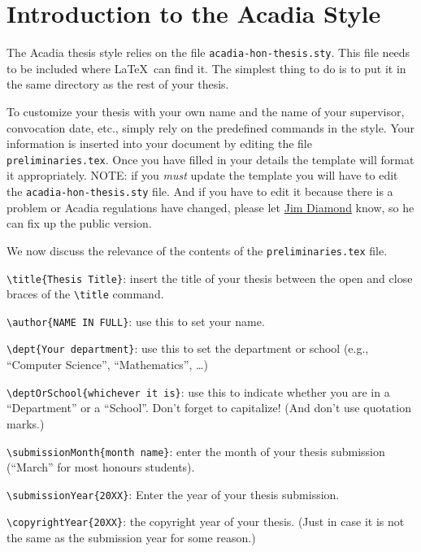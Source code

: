 

\chapter{Introduction to the Acadia Style}
\label{chap:INTRO}

The Acadia thesis style relies on the file \verb|acadia-hon-thesis.sty|.
This file needs to be included where \LaTeX\ can find it.  The
simplest thing to do is to put it in the same directory as the rest of
your thesis.

To customize your thesis with your own name and the name of your
supervisor, convocation date, etc., simply rely on the predefined
commands in the style.  Your information is inserted into your
document by editing the file \verb|preliminaries.tex|.  Once you have
filled in your details the template will format it appropriately.
NOTE: if you \emph{must} update the template you will have to edit the
\verb|acadia-hon-thesis.sty| file.  And if you have to edit it because
there is a problem or Acadia regulations have changed, please let
\href{mailto:jim.diamond@acadiau.ca}{Jim Diamond} know, so he can fix
up the public version.

We now discuss the relevance of the contents of the 
\verb|preliminaries.tex| file.

\smallskip
\noindent\verb|\title{Thesis Title}|: insert the title of your thesis
between the open and close braces of the \verb|\title| command.

\smallskip
\noindent\verb|\author{NAME IN FULL}|: use this to set your name.

\smallskip
\noindent\verb|\dept{Your department}|: use this to set the department
or school (e.g., ``Computer Science'', ``Mathematics'', \dots)

\smallskip
\noindent\verb|\deptOrSchool{whichever it is}|: use this to indicate
whether you are in a ``Department'' or a ``School''.  Don't forget to
capitalize!  (And don't use quotation marks.)

\smallskip
\noindent\verb|\submissionMonth{month name}|: enter the month of your
thesis submission (``March'' for most honours students).

\smallskip
\noindent\verb|\submissionYear{20XX}|: Enter the year of your
thesis submission.

\smallskip
\noindent\verb|\copyrightYear{20XX}|: the copyright year of your thesis.
(Just in case it is not the same as the submission year for some reason.)

